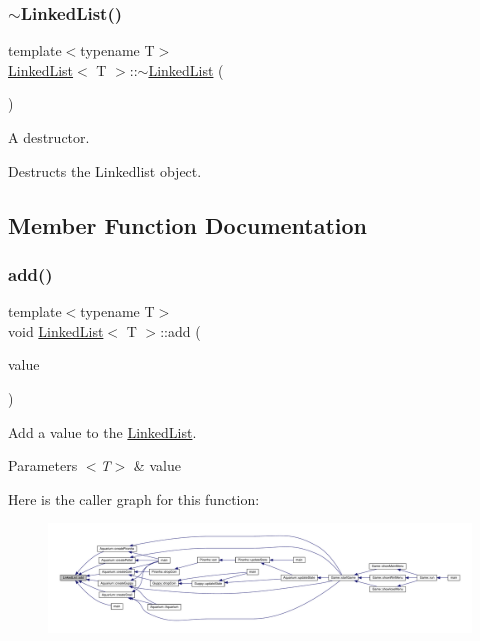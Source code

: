 \subsubsection{\texorpdfstring{$\sim$\+Linked\+List()}{~LinkedList()}}
{\footnotesize\ttfamily template$<$typename T$>$ \\
\mbox{\hyperlink{class_linked_list}{Linked\+List}}$<$ T $>$\+::$\sim$\mbox{\hyperlink{class_linked_list}{Linked\+List}} (\begin{DoxyParamCaption}{ }\end{DoxyParamCaption})\hspace{0.3cm}{\ttfamily [inline]}}



A destructor. 

Destructs the Linkedlist object. 

\subsection{Member Function Documentation}
\mbox{\label{class_linked_list_a188425c092c410b45ab70a3d396aff67}} 
\subsubsection{\texorpdfstring{add()}{add()}}
{\footnotesize\ttfamily template$<$typename T$>$ \\
void \mbox{\hyperlink{class_linked_list}{Linked\+List}}$<$ T $>$\+::add (\begin{DoxyParamCaption}\item[{T}]{value }\end{DoxyParamCaption})\hspace{0.3cm}{\ttfamily [inline]}}



Add a value to the \mbox{\hyperlink{class_linked_list}{Linked\+List}}. 


\begin{DoxyParams}{Parameters}
{\em $<$\+T$>$} & value \\
\hline
\end{DoxyParams}
Here is the caller graph for this function\+:
\nopagebreak
\begin{figure}[H]
\begin{center}
\leavevmode
\includegraphics[width=350pt]{class_linked_list_a188425c092c410b45ab70a3d396aff67_icgraph}
\end{center}
\end{figure}
\mbox{\label{class_linked_list_a23f2995817766b699c45a02d0040d741}} 
